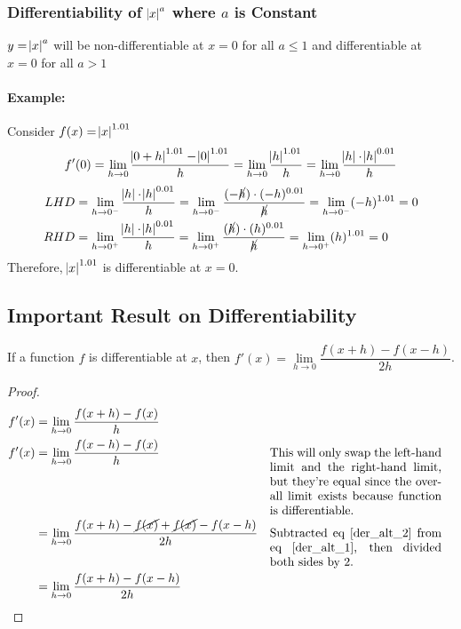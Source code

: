 \documentclass[14]{article}
\theoremstyle{definition}
\begin{document}
\subsubsection{Differentiability of $\abs{x}^a$ where $a$ is Constant}
$y = \abs{x}^a$ will be non-differentiable at $x = 0$ for all $a \leq 1$ and differentiable at $x = 0$ for all $a > 1$\\
\paragraph{Example:} Consider $f(x) = \abs{x}^{1.01}$
\[
	f'(0) = \lim\limits_{h \to 0} \dfrac{\abs{0+h}^{1.01} - \abs{0}^{1.01}}{h} = \lim\limits_{h \to 0} \dfrac{\abs{h}^{1.01}}{h} = \lim\limits_{h \to 0} \dfrac{\abs{h} \cdot \abs{h}^{0.01}}{h}
\]
\begin{align*}
LHD &= \lim\limits_{h \to 0^-} \dfrac{\abs{h} \cdot \abs{h}^{0.01}}{h} = \lim\limits_{h \to 0^-} \dfrac{(-\cancel{h}) \cdot (-h)^{0.01}}{\cancel{h}} = \lim\limits_{h \to 0^-} (-h)^{1.01} = 0\\
RHD &= \lim\limits_{h \to 0^+} \dfrac{\abs{h} \cdot \abs{h}^{0.01}}{h} = \lim\limits_{h \to 0^+} \dfrac{(\cancel{h}) \cdot (h)^{0.01}}{\cancel{h}} = \lim\limits_{h \to 0^+} (h)^{1.01} = 0
\end{align*}
Therefore, $\abs{x}^{1.01}$ is differentiable at $x = 0$.
\pagebreak
\subsection{Important Result on Differentiability}
If a function $f$ is differentiable at $x$, then $f'(x) = \lim\limits_{h \to 0} \dfrac{f(x + h) - f(x - h)}{2h}$.\\
\begin{proof}
\begin{align}
f'(x) &= \lim\limits_{h \to 0} \dfrac{f(x+h) - f(x)}{h} \label{der_alt_1}\\
f'(x) &= \lim\limits_{h \to 0} \dfrac{f(x -h) - f(x)}{h} && \parbox[t]{5cm}{
          This will only swap the left-hand limit and the right-hand limit, but they're equal since the overall limit exists because function is differentiable.} \label{der_alt_2}\\
&= \lim\limits_{h \to 0} \dfrac{f(x + h) - \cancel{ f(x)} + \cancel{f(x)} - f(x - h)}{2h} && \parbox[t]{5cm}{Subtracted eq \eqref{der_alt_2} from eq \eqref{der_alt_1}, then divided both sides by 2.}\\
&= \lim\limits_{h \to 0} \dfrac{f(x + h) - f(x - h)}{2h}
\end{align}
\end{proof}
\end{document}
